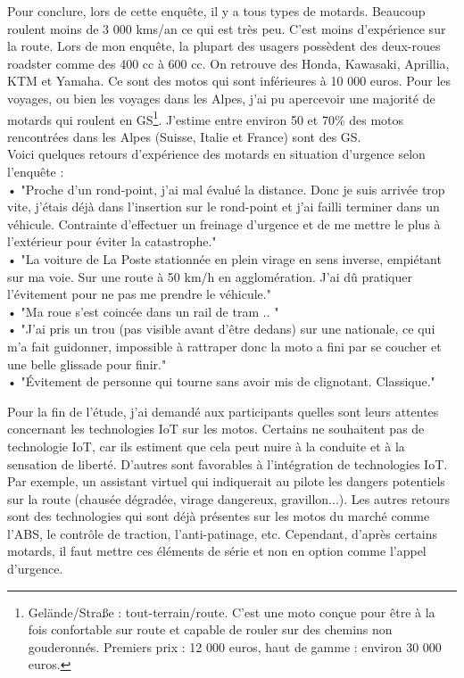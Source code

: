 Pour conclure, lors de cette enquête, il y a tous types de motards. Beaucoup roulent moins de 3 000 kms/an ce qui est très peu. C'est moins d'expérience sur la route.
Lors de mon enquête, la plupart des usagers possèdent des deux-roues roadster comme des 400 cc à 600 cc. On retrouve des Honda, Kawasaki, Aprillia, KTM et Yamaha. Ce sont des motos qui sont inférieures à 10 000 euros.
Pour les voyages, ou bien les voyages dans les Alpes, j'ai pu apercevoir une majorité de motards qui roulent en GS\footnote{Gelände/Straße : tout-terrain/route. C'est une moto conçue pour être à la fois confortable sur route et capable de rouler sur des chemins non gouderonnés. Premiers prix : 12 000 euros, haut de gamme : environ 30 000 euros.}. J'estime entre environ 50 et 70\% des motos rencontrées dans les Alpes (Suisse, Italie et France) sont des GS.\\
Voici quelques retours d'expérience des motards en situation d'urgence selon l'enquête :\\
• "Proche d'un rond-point, j'ai mal évalué la distance. Donc je suis arrivée trop vite, j'étais déjà dans l'insertion sur le rond-point et j'ai failli terminer dans un véhicule. Contrainte d'effectuer un freinage d'urgence et de me mettre le plus à l'extérieur pour éviter la catastrophe."\\
• "La voiture de La Poste stationnée en plein virage en sens inverse, empiétant sur ma voie. Sur une route à 50 km/h en agglomération. J'ai dû pratiquer l'évitement pour ne pas me prendre le véhicule."\\
• "Ma roue s’est coincée dans un rail de tram .. "\\
• "J'ai pris un trou (pas visible avant d'être dedans) sur une nationale, ce qui m'a fait guidonner, impossible à rattraper donc la moto a fini par se coucher et une belle glissade pour finir."\\
• "Évitement de personne qui tourne sans avoir mis de clignotant. Classique."
\vspace{0.5cm}

Pour la fin de l'étude, j'ai demandé aux participants quelles sont leurs attentes concernant les technologies IoT sur les motos. Certains ne souhaitent pas de technologie IoT, car ils estiment que cela peut nuire à la conduite et à la sensation de liberté. D'autres sont favorables à l'intégration de technologies IoT. Par exemple, un assistant virtuel qui indiquerait au pilote les dangers potentiels sur la route (chausée dégradée, virage dangereux, gravillon...). Les autres retours sont des technologies qui sont déjà présentes sur les motos du marché comme l'ABS, le contrôle de traction, l'anti-patinage, etc. Cependant, d'après certains motards, il faut mettre ces éléments de série et non en option comme l'appel d'urgence.
\vspace{0.5cm}

